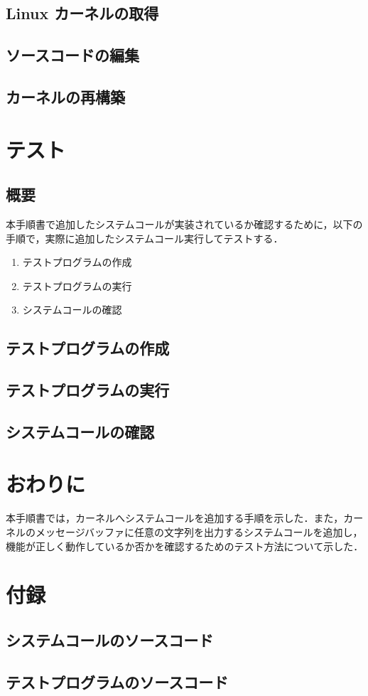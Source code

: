 \documentclass[12pt]{jsarticle}
\begin{document}
\subsection{Linux カーネルの取得}\label{sec:syutoku}

\subsection{ソースコードの編集}\label{sec:hensyuu}

\subsection{カーネルの再構築}\label{sec:saikoutiku}

\section{テスト}\label{sec:test}
 \subsection{概要}
 本手順書で追加したシステムコールが実装されているか確認するために，以下の手順で，実際に追加したシステムコール実行してテストする．
\begin{enumerate}
 \item テストプログラムの作成
 \item テストプログラムの実行
 \item システムコールの確認
\end{enumerate}
  \subsection{テストプログラムの作成}
   \subsection{テストプログラムの実行}
    \subsection{システムコールの確認}
 

\section{おわりに}\label{sec:owari}
本手順書では，カーネルへシステムコールを追加する手順を示した．また，カーネルのメッセージバッファに任意の文字列を出力するシステムコールを追加し，機能が正しく動作しているか否かを確認するためのテスト方法について示した．

\section{付録}\label{sec:huroku}
 \subsection{システムコールのソースコード}
  \subsection{テストプログラムのソースコード}



\end{document}
